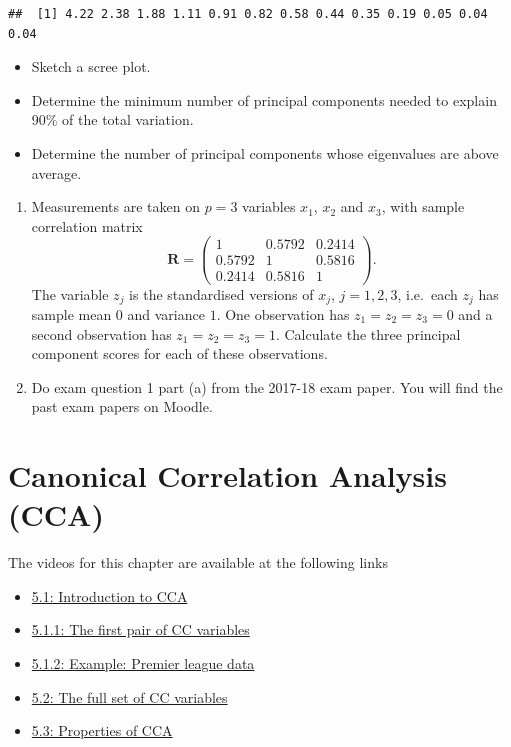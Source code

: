 \documentclass[
]{book}
\providecommand{\tightlist}{%
  \setlength{\itemsep}{0pt}\setlength{\parskip}{0pt}}
\theoremstyle{definition}
\theoremstyle{definition}
\theoremstyle{definition}
\theoremstyle{definition}
\theoremstyle{remark}
\begin{document}
\begin{verbatim}
##  [1] 4.22 2.38 1.88 1.11 0.91 0.82 0.58 0.44 0.35 0.19 0.05 0.04 0.04
\end{verbatim}

\begin{itemize}
\tightlist
\item
  Sketch a scree plot.
\item
  Determine the minimum number of principal components needed to explain 90\% of the total variation.
\item
  Determine the number of principal components whose eigenvalues are above average.
\end{itemize}

\begin{enumerate}
\def\labelenumi{\arabic{enumi}.}
\setcounter{enumi}{3}
\item
  Measurements are taken on \(p=3\) variables \(x_1\), \(x_2\) and \(x_3\), with sample correlation matrix
  \[
   \mathbf R= \begin{pmatrix} 1 & 0.5792 & 0.2414 \\ 0.5792 & 1 & 0.5816 \\ 0.2414 & 0.5816 & 1 \end{pmatrix}.
  \]
  The variable \(z_j\) is the standardised versions of \(x_j\), \(j=1,2,3\), i.e.~each \(z_j\) has sample mean \(0\) and variance \(1\).
  One observation has \(z_1 = z_2 = z_3 = 0\) and a second observation has \(z_1 = z_2 = z_3 =1\). Calculate the three
  principal component scores for
  each of these observations.
\item
  Do exam question 1 part (a) from the 2017-18 exam paper. You will find the past exam papers on Moodle.
\end{enumerate}

\hypertarget{cca}{%
\chapter{Canonical Correlation Analysis (CCA)}\label{cca}}

The videos for this chapter are available at the following links

\begin{itemize}
\tightlist
\item
  \href{https://mediaspace.nottingham.ac.uk/media/CCA+Introduction/1_qhk7v35f}{5.1: Introduction to CCA}
\item
  \href{https://mediaspace.nottingham.ac.uk/media/CCAA+First+CC/1_yjm6kkxf}{5.1.1: The first pair of CC variables}
\item
  \href{https://mediaspace.nottingham.ac.uk/media/CCAA+Football+Example/1_r2v6924j}{5.1.2: Example: Premier league data}
\item
  \href{https://mediaspace.nottingham.ac.uk/media/CCAA+Full+Set/1_xmdoi9i6}{5.2: The full set of CC variables}
\item
  \href{https://mediaspace.nottingham.ac.uk/media/CCA\%3A\%20Properties/1_g24h27bj}{5.3: Properties of CCA}
\end{itemize}
\end{document}
